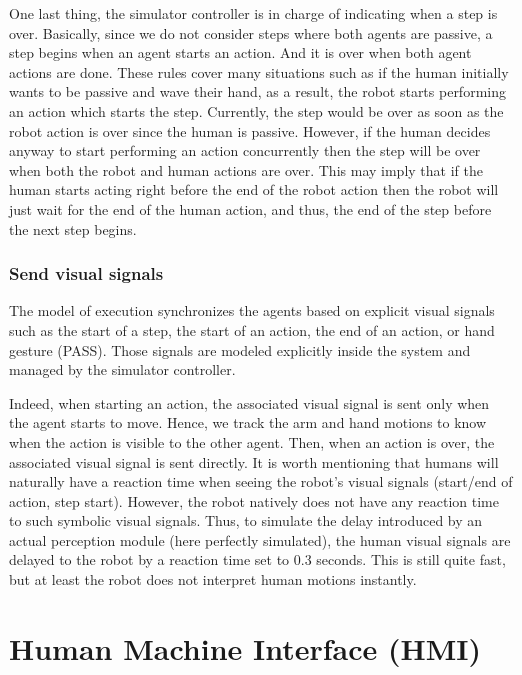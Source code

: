 One last thing, the simulator controller is in charge of indicating when a step is over. Basically, since we do not consider steps where both agents are passive, a step begins when an agent starts an action. And it is over when both agent actions are done. These rules cover many situations such as if the human initially wants to be passive and wave their hand, as a result, the robot starts performing an action which starts the step. Currently, the step would be over as soon as the robot action is over since the human is passive. However, if the human decides anyway to start performing an action concurrently then the step will be over when both the robot and human actions are over. This may imply that if the human starts acting right before the end of the robot action then the robot will just wait for the end of the human action, and thus, the end of the step before the next step begins.  

\subsubsection{Send visual signals}

The model of execution synchronizes the agents based on explicit visual signals such as the start of a step, the start of an action, the end of an action, or hand gesture (PASS). Those signals are modeled explicitly inside the system and managed by the simulator controller.

Indeed, when starting an action, the associated visual signal is sent only when the agent starts to move. Hence, we track the arm and hand motions to know when the action is visible to the other agent. Then, when an action is over, the associated visual signal is sent directly. It is worth mentioning that humans will naturally have a reaction time when seeing the robot's visual signals (start/end of action, step start). However, the robot natively does not have any reaction time to such symbolic visual signals. Thus, to simulate the delay introduced by an actual perception module (here perfectly simulated), the human visual signals are delayed to the robot by a reaction time set to 0.3 seconds. This is still quite fast, but at least the robot does not interpret human motions instantly.   




\section{Human Machine Interface (HMI)}

